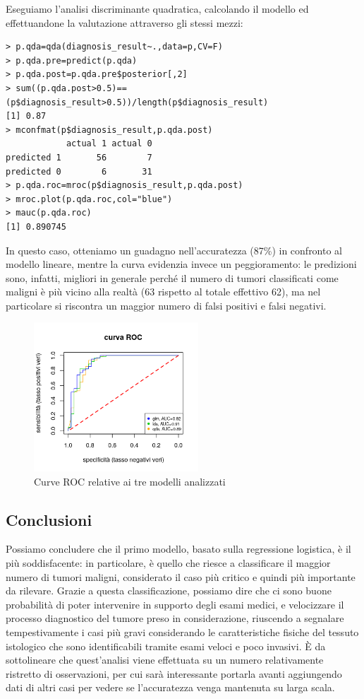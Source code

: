 \documentclass[11pt,a4paper,oneside]{article}
\begin{document}
Eseguiamo l'analisi discriminante quadratica, calcolando il modello ed effettuandone la valutazione attraverso gli stessi mezzi:
\begin{verbatim}
> p.qda=qda(diagnosis_result~.,data=p,CV=F)
> p.qda.pre=predict(p.qda)
> p.qda.post=p.qda.pre$posterior[,2]
> sum((p.qda.post>0.5)==(p$diagnosis_result>0.5))/length(p$diagnosis_result)
[1] 0.87
> mconfmat(p$diagnosis_result,p.qda.post)
            actual 1 actual 0
predicted 1       56        7
predicted 0        6       31
> p.qda.roc=mroc(p$diagnosis_result,p.qda.post)
> mroc.plot(p.qda.roc,col="blue")
> mauc(p.qda.roc)
[1] 0.890745
\end{verbatim}
In questo caso, otteniamo un guadagno nell'accuratezza (87\%) in confronto al modello lineare, mentre la curva evidenzia invece un peggioramento: le predizioni sono, infatti, migliori in generale perché il numero di tumori classificati come maligni è più vicino alla realtà (63 rispetto al totale effettivo 62), ma nel particolare si riscontra un maggior numero di falsi positivi e falsi negativi.
\begin{figure}[h]
\centering
\includegraphics[width=0.55\textwidth]{images/curveROC}
\caption{Curve ROC relative ai tre modelli analizzati}
\label{fig:curveROC}
\end{figure}

\subsection{Conclusioni}
Possiamo concludere che il primo modello, basato sulla regressione logistica, è il più soddisfacente: in particolare, è quello che riesce a classificare il maggior numero di tumori maligni, considerato il caso più critico e quindi più importante da rilevare. Grazie a questa classificazione, possiamo dire che ci sono buone probabilità di poter intervenire in supporto degli esami medici, e velocizzare il processo diagnostico del tumore preso in considerazione, riuscendo a segnalare tempestivamente i casi più gravi considerando le caratteristiche fisiche del tessuto istologico che sono identificabili tramite esami veloci e poco invasivi. È da sottolineare che quest'analisi viene effettuata su un numero relativamente ristretto di osservazioni, per cui sarà interessante portarla avanti aggiungendo dati di altri casi per vedere se l'accuratezza venga mantenuta su larga scala.
\end{document}
